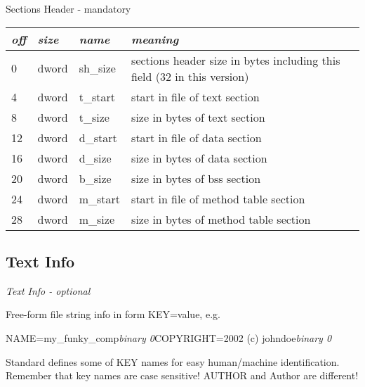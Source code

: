 \documentclass[onecolumn]{article}
\begin{document}
\begin{center}
\par Sections Header - mandatory
\begin{tabular}{|l|l|l|l|}\hline
\emph{off} & \emph{size} & \emph{name} & \emph{meaning} \\
\hline\hline
0      & dword    & sh\_size    & sections header size in bytes including this field (32 in this version) \\
4      & dword    & t\_start    & start in file of text section \\
8      & dword    & t\_size     & size in bytes of text section \\
12     & dword    & d\_start    & start in file of data section \\
16     & dword    & d\_size     & size in bytes of data section \\
20     & dword    & b\_size     & size in bytes of bss section \\
24     & dword    & m\_start    & start in file of method table section \\
28     & dword    & m\_size     & size in bytes of method table section \\
\hline
\end{tabular}
\end{center}


\subsection{Text Info}
\label{sec:textinfo}

\par \emph{Text Info - optional}

\par Free-form file string info in form KEY=value, e.g.
\par NAME=my\_funky\_comp\emph{binary 0}COPYRIGHT=2002 (c) johndoe\emph{binary 0}

\par Standard defines some of KEY names for easy human/machine identification.
Remember that key names are case sensitive! AUTHOR and Author are different!
\end{document}
